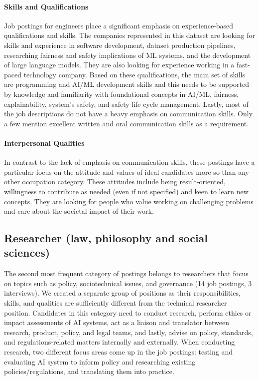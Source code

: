 \documentclass[sigconf]{acmart}
\begin{document}
\paragraph{Skills and Qualifications} 
Job postings for engineers place a significant emphasis on experience-based qualifications and skills. The companies represented in this dataset are looking for skills and experience in software development, dataset production pipelines, researching fairness and safety implications of ML systems, and the development of large language models. They are also looking for experience working in a fast-paced technology company. Based on these qualifications, the main set of skills are programming and \ac{AI}/ML development skills and this needs to be supported by knowledge and familiarity with foundational concepts in \ac{AI}/ML, fairness, explainability, system's safety, and safety life cycle management. Lastly, most of the job descriptions do not have a heavy emphasis on communication skills. Only a few mention excellent written and oral communication skills as a requirement.

\paragraph{Interpersonal Qualities}
 In contrast to the lack of emphasis on communication skills, these postings have a particular focus on the attitude and values of ideal candidates more so than any other occupation category. These attitudes include being result-oriented, willingness to contribute as needed (even if not specified) and keen to learn new concepts. They are looking for people who value working on challenging problems and care about the societal impact of their work. 

\subsection{Researcher (law, philosophy and social sciences)}
The second most frequent category of postings belongs to researchers that focus on topics such as policy, sociotechnical issues, and governance (14 job postings, 3 interviews). We created a separate group of positions as their responsibilities, skills, and qualities are sufficiently different from the technical researcher position. Candidates in this category need to conduct research, perform ethics or impact assessments of \ac{AI} systems, act as a liaison and translator between research, product, policy, and legal teams, and lastly, advise on policy, standards, and regulations-related matters internally and externally. When conducting research, two different focus areas come up in the job postings: testing and evaluating \ac{AI} system to inform policy and researching existing policies/regulations, and translating them into practice.
\end{document}
